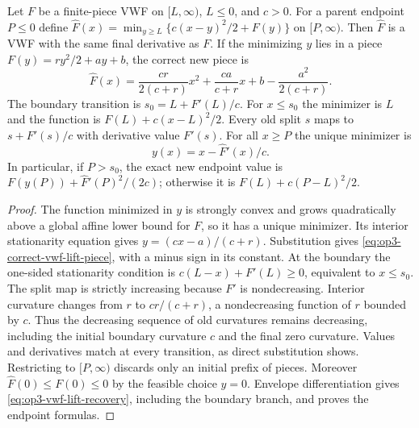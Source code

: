 \begin{lemma}
\label{lem:op3-correct-vwf-lift}
Let $F$ be a finite-piece VWF on $[L,\infty)$, $L\leq0$, and $c>0$.
For a parent endpoint $P\leq0$ define
$\widehat F(x)=\min_{y\geq L}\{c(x-y)^2/2+F(y)\}$ on $[P,\infty)$.
Then $\widehat F$ is a VWF with the same final derivative as $F$.
If the minimizing $y$ lies in a piece
$F(y)=ry^2/2+ay+b$, the correct new piece is
\begin{equation}
 \widehat F(x)=\frac{cr}{2(c+r)}x^2+
 \frac{ca}{c+r}x+b-\frac{a^2}{2(c+r)}.
 \label{eq:op3-correct-vwf-lift-piece}
\end{equation}
The boundary transition is $s_0=L+F'(L)/c$. For $x\leq s_0$ the
minimizer is $L$ and the function is $F(L)+c(x-L)^2/2$.
Every old split $s$ maps to $s+F'(s)/c$ with derivative value $F'(s)$.
For all $x\geq P$ the unique minimizer is
\begin{equation}
 y(x)=x-\widehat F'(x)/c.
 \label{eq:op3-vwf-lift-recovery}
\end{equation}
In particular, if $P>s_0$, the exact new endpoint value is
$F(y(P))+\widehat F'(P)^2/(2c)$; otherwise it is $F(L)+c(P-L)^2/2$.
\end{lemma}
\begin{proof}
The function minimized in $y$ is strongly convex and grows quadratically
above a global affine lower bound for $F$, so it has a unique minimizer.
Its interior stationarity equation gives $y=(cx-a)/(c+r)$.
Substitution gives \eqref{eq:op3-correct-vwf-lift-piece}, with a minus
sign in its constant. At the boundary the one-sided stationarity condition
is $c(L-x)+F'(L)\geq0$, equivalent to $x\leq s_0$.
The split map is strictly increasing because $F'$ is nondecreasing.
Interior curvature changes from $r$ to $cr/(c+r)$, a nondecreasing
function of $r$ bounded by $c$. Thus the decreasing sequence of old
curvatures remains decreasing, including the initial boundary curvature
$c$ and the final zero curvature. Values and derivatives match at every
transition, as direct substitution shows. Restricting to $[P,\infty)$
discards only an initial prefix of pieces. Moreover
$\widehat F(0)\leq F(0)\leq0$ by the feasible choice $y=0$.
Envelope differentiation gives \eqref{eq:op3-vwf-lift-recovery}, including
the boundary branch, and proves the endpoint formulas.
\end{proof}

